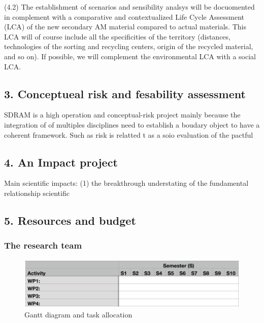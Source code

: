 \documentclass[
  11pt,
  a4paperpaper,
  onecolumn]{article}
\begin{document}
(4.2) The establishment of scenarios and sensibility analsys will be
docuomented in complement with a comparative and contextualized Life
Cycle Assessment (LCA) of the new secondary AM material compared to
actual materials. This LCA will of course include all the specificities
of the territory (distances, technologies of the sorting and recycling
centers, origin of the recycled material, and so on). If possible, we
will complement the environmental LCA with a social LCA.

\hypertarget{conceptueal-risk-and-fesability-assessment}{%
\subsection{3. Conceptueal risk and fesability
assessment}\label{conceptueal-risk-and-fesability-assessment}}

SDRAM is a high operation and conceptual-risk project mainly because the
integration of of multiples disciplines need to establish a boudary
object to have a coherent framework. Such as risk is relatted t as a
soio evaluation of the pactful

\hypertarget{an-impact-project}{%
\subsection{4. An Impact project}\label{an-impact-project}}

Main scientific impacts: (1) the breakthrough understating of the
fundamental relationship scientific

\hypertarget{resources-and-budget}{%
\subsection{5. Resources and budget}\label{resources-and-budget}}

\hypertarget{the-research-team}{%
\subsubsection{The research team}\label{the-research-team}}

\begin{figure}
\centering
    \includegraphics[width=0.9\linewidth]{Gantt/Gantt-B1.pdf}
    \caption{Gantt diagram and task allocation}
    \label{fig:gantt-b1}
\end{figure}
\end{document}
